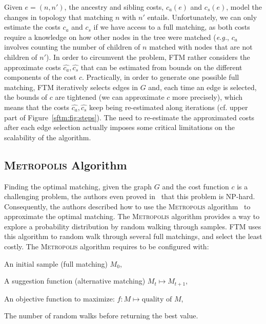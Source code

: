 Given $e=(n, n')$, the ancestry and sibling costs, $c_a(e)$ and $c_s(e)$, model the changes in topology that matching $n$ with $n'$ entails.
Unfortunately, we can only estimate the costs $c_a$ and $c_s$ if we have access to a full matching, as both costs require a knowledge on how other nodes in the tree were matched (\emph{e.g.}, $c_a$ involves counting the number of children of $n$ matched with nodes that are not children of $n'$).
In order to circumvent the problem, FTM rather considers the approximate costs $\hat{c_a}, \hat{c_s}$ that can be estimated from bounds on the different components of the cost $c$.
Practically, in order to generate one possible full matching, FTM iteratively selects edges in $G$ and, each time an edge is selected, the bounds of $c$ are tightened (we can approximate $c$ more precisely), which means that the costs $\hat{c_a}, \hat{c_s}$ keep being re-estimated along iterations (cf. upper part of Figure~\ref{sftm:fig:steps}).
The need to re-estimate the approximated costs after each edge selection actually imposes some critical limitations on the scalability of the algorithm.

\subsection{\textsc{Metropolis} Algorithm}\label{sftm:sec:metropolis_ftm}%
Finding the optimal matching, given the graph $G$ and the cost function $c$ is a challenging problem, the authors even proved in~\cite{Kumar2011_FTM} that this problem is NP-hard.
Consequently, the authors described how to use the \textsc{Metropolis} algorithm~\cite{metropolis1953equation} to approximate the optimal matching. 
The \textsc{Metropolis} algorithm provides a way to explore a probability distribution by random walking through samples.
FTM uses this algorithm to random walk through several full matchings, and select the least costly.
The \textsc{Metropolis} algorithm requires to be configured with:
\begin{compactenum}
    \item An initial sample (full matching) $M_0$,
    \item A suggestion function (alternative matching) $M_t \mapsto M_{t+1}$,
    \item An objective function to maximize: $f: M \mapsto \text{quality of } M$,
    \item The number of random walks before returning the best value.
\end{compactenum}


